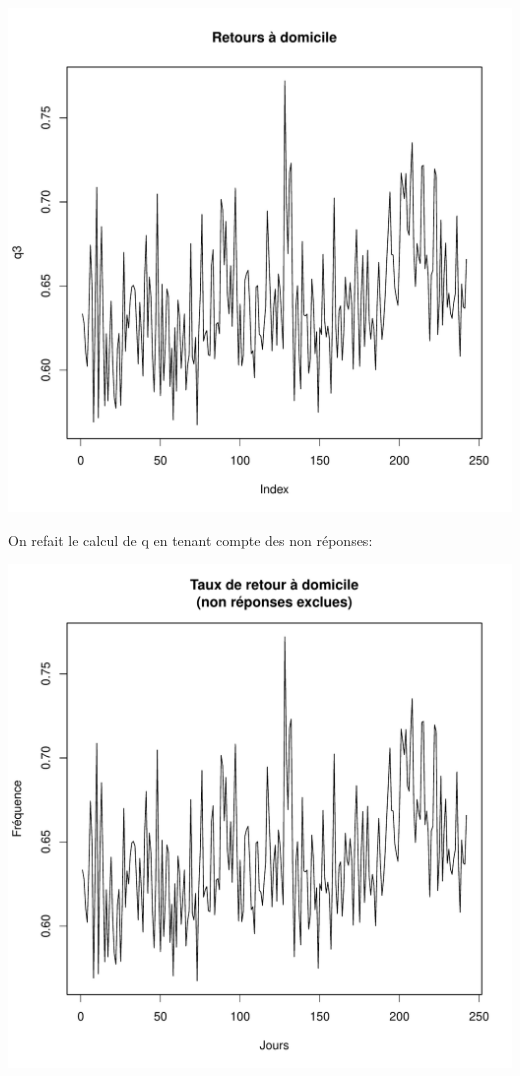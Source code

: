 \documentclass[12pt,english,french,twoside]{report}\usepackage[]{graphicx}\usepackage[]{color}
\makeatletter
\def\maxwidth{ %
  \ifdim\Gin@nat@width>\linewidth
    \linewidth
  \else
    \Gin@nat@width
  \fi
}
\makeatother
\begin{document}
\includegraphics[width=\maxwidth]{figure/retour_dom} 



On refait le calcul de q en tenant compte des non réponses:

\includegraphics[width=\maxwidth]{figure/retour_dom2} 
\end{document}
